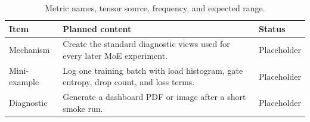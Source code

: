 \begin{table}[H]
\centering
\caption{Metric names, tensor source, frequency, and expected range.}
\label{tab:ch07-routing-dashboards-and-training-logs}
\begin{tabularx}{\textwidth}{p{}X p{}}
\toprule
Item & Planned content & Status \\
\midrule
Mechanism & Create the standard diagnostic views used for every later MoE experiment. & Placeholder \\
Mini-example & Log one training batch with load histogram, gate entropy, drop count, and loss terms. & Placeholder \\
Diagnostic & Generate a dashboard PDF or image after a short smoke run. & Placeholder \\
\bottomrule
\end{tabularx}
\end{table}
